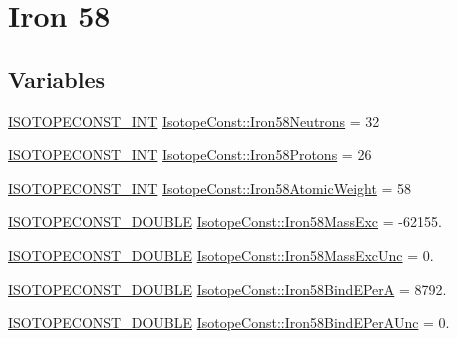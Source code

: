 \hypertarget{group___isotope_const-_iron-_fe58}{}\section{Iron 58}
\label{group___isotope_const-_iron-_fe58}
\subsection*{Variables}
\begin{DoxyCompactItemize}
\item 
\mbox{\hyperlink{group___isotope_const-_macros_ga5f18360b3e99483a35c32d789e62621c}{I\+S\+O\+T\+O\+P\+E\+C\+O\+N\+S\+T\+\_\+\+I\+NT}} \mbox{\hyperlink{group___isotope_const-_iron-_fe58_ga9231e564be191d7e1894b7b56c633b80}{Isotope\+Const\+::\+Iron58\+Neutrons}} = 32
\item 
\mbox{\hyperlink{group___isotope_const-_macros_ga5f18360b3e99483a35c32d789e62621c}{I\+S\+O\+T\+O\+P\+E\+C\+O\+N\+S\+T\+\_\+\+I\+NT}} \mbox{\hyperlink{group___isotope_const-_iron-_fe58_ga0e6d29da7281236fe1717dcd0258ba9b}{Isotope\+Const\+::\+Iron58\+Protons}} = 26
\item 
\mbox{\hyperlink{group___isotope_const-_macros_ga5f18360b3e99483a35c32d789e62621c}{I\+S\+O\+T\+O\+P\+E\+C\+O\+N\+S\+T\+\_\+\+I\+NT}} \mbox{\hyperlink{group___isotope_const-_iron-_fe58_gadf0b9dfde2c7e5bd69ea9552d6fef0d1}{Isotope\+Const\+::\+Iron58\+Atomic\+Weight}} = 58
\item 
\mbox{\hyperlink{group___isotope_const-_macros_ga8f45a7272ce02c0b4c65c44636ed719a}{I\+S\+O\+T\+O\+P\+E\+C\+O\+N\+S\+T\+\_\+\+D\+O\+U\+B\+LE}} \mbox{\hyperlink{group___isotope_const-_iron-_fe58_ga02d03247504ffcad00d11125222609a3}{Isotope\+Const\+::\+Iron58\+Mass\+Exc}} = -\/62155.
\item 
\mbox{\hyperlink{group___isotope_const-_macros_ga8f45a7272ce02c0b4c65c44636ed719a}{I\+S\+O\+T\+O\+P\+E\+C\+O\+N\+S\+T\+\_\+\+D\+O\+U\+B\+LE}} \mbox{\hyperlink{group___isotope_const-_iron-_fe58_gab30e0afe8c03cd9f024c84df4228d510}{Isotope\+Const\+::\+Iron58\+Mass\+Exc\+Unc}} = 0.
\item 
\mbox{\hyperlink{group___isotope_const-_macros_ga8f45a7272ce02c0b4c65c44636ed719a}{I\+S\+O\+T\+O\+P\+E\+C\+O\+N\+S\+T\+\_\+\+D\+O\+U\+B\+LE}} \mbox{\hyperlink{group___isotope_const-_iron-_fe58_ga96b13660b249984062c6ba0589d6d47d}{Isotope\+Const\+::\+Iron58\+Bind\+E\+PerA}} = 8792.
\item 
\mbox{\hyperlink{group___isotope_const-_macros_ga8f45a7272ce02c0b4c65c44636ed719a}{I\+S\+O\+T\+O\+P\+E\+C\+O\+N\+S\+T\+\_\+\+D\+O\+U\+B\+LE}} \mbox{\hyperlink{group___isotope_const-_iron-_fe58_gadc5d114b881192006230256a69089047}{Isotope\+Const\+::\+Iron58\+Bind\+E\+Per\+A\+Unc}} = 0.

\end{DoxyCompactItemize}

